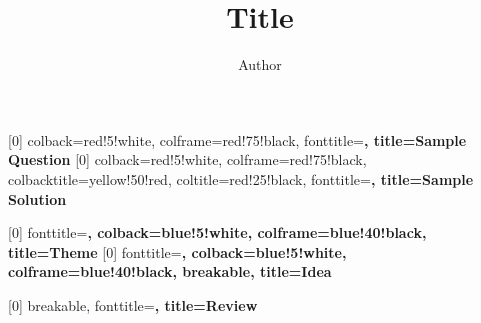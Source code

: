 \documentclass{article}
\title{Title}
\author{Author}
\date{ }
\numberwithin{equation}{section}
\theoremstyle{classic}
\begin{document}
[0]{
    colback=red!5!white,
    colframe=red!75!black,
    fonttitle=\bfseries,
    title=Sample Question
}
[0]{
    colback=red!5!white,
    colframe=red!75!black,
    colbacktitle=yellow!50!red,
    coltitle=red!25!black,
    fonttitle=\bfseries,
    title=Sample Solution
}

[0]{
    fonttitle=\bfseries,
    colback=blue!5!white,
    colframe=blue!40!black,
    title=Theme
}
[0]{
    fonttitle=\bfseries,
    colback=blue!5!white,
    colframe=blue!40!black,
    breakable,
    title=Idea
}

[0]{
    breakable,
    fonttitle=\bfseries,
    title=Review
}

\maketitle

\tableofcontents
\newpage
\end{document}
